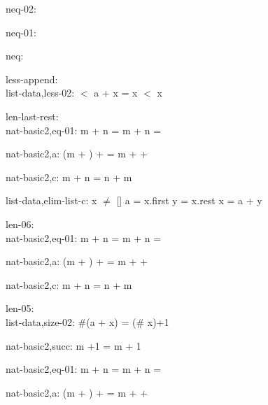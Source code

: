 \documentclass[a4paper]{article}
\begin{document}
\bigskip

neq-02:\\ 

\bigskip

neq-01:\\ 

\bigskip

neq:\\ 

\bigskip

less-append:\\ list-data,less-02: 
 \Fol {} $<$ a + x \Equiv {} = x \Or {} $<$ x



\bigskip

len-last-rest:\\ nat-basic2,eq-01: 
 \Fol m + n = m +  \Equiv n = 



nat-basic2,a: 
 \Fol (m + ) +  = m +  + 



nat-basic2,c: 
 \Fol m + n = n + m



list-data,elim-list-c: 
x $\neq$ []
 \Fol a = x.first \And y = x.rest \Equiv x = a + y



\bigskip

len-06:\\ nat-basic2,eq-01: 
 \Fol m + n = m +  \Equiv n = 



nat-basic2,a: 
 \Fol (m + ) +  = m +  + 



nat-basic2,c: 
 \Fol m + n = n + m



\bigskip

len-05:\\ list-data,size-02: 
 \Fol \#(a + x) = (\# x)+1



nat-basic2,succ: 
 \Fol m +1 = m + 1



nat-basic2,eq-01: 
 \Fol m + n = m +  \Equiv n = 



nat-basic2,a: 
 \Fol (m + ) +  = m +  + 
\end{document}

